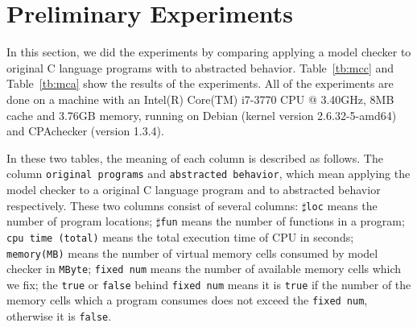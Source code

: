 \section{Preliminary Experiments}
\label{sec:experiment}
In this section, we did the experiments by comparing applying a model
checker to original C language programs with to abstracted
behavior. Table~\ref{tb:mcc} and Table~\ref{tb:mca} show the results
of the experiments. All of the experiments are done on a machine with
an Intel(R) Core(TM) i7-3770 CPU @ 3.40GHz, 8MB cache and 3.76GB memory, running
on Debian (kernel version 2.6.32-5-amd64) and CPAchecker (version 1.3.4).

In these two tables, the meaning of each column is described as
follows. The column \texttt{original programs} and \texttt{abstracted behavior},
which mean applying the model checker to a original C language
program and to abstracted behavior respectively. These two columns
consist of several columns: $\sharp$\texttt{loc} means the number of
program locations; $\sharp$\texttt{fun} means the number of functions
in a program; \texttt{cpu time (total)} means the total execution time
of CPU in seconds; \texttt{memory(MB)} means the number of virtual
memory cells consumed by model checker in \texttt{MByte};
\texttt{fixed num} means the number of available memory cells which we
fix; the \texttt{true} or \texttt{false} behind \texttt{fixed num}
means it is \texttt{true} if the number of the memory cells which a
program consumes does not exceed the \texttt{fixed num}, otherwise it
is \texttt{false}.


